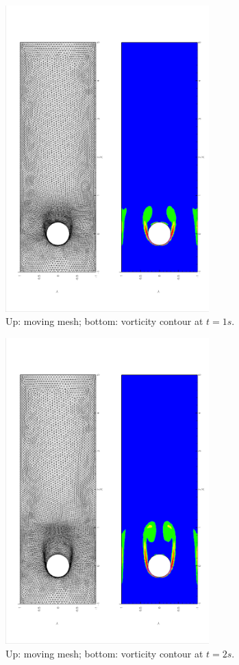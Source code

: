 \documentclass[a4paper, 11pt]{article}
\begin{document}
      \begin{figure}[!htbp]
        \centering
        \includegraphics[width = 0.7\textwidth, angle = -90]{picture/obstacle_flow_data/mesh_t_1s.eps}
        \caption{\small Up: moving mesh; bottom: vorticity
          contour at $t = 1s$.}
        \label{fig::cylinder_mesh_t1s}
      \end{figure}

     \begin{figure}[!htbp]
        \centering
        \includegraphics[width = 0.7\textwidth, angle = -90]{picture/obstacle_flow_data/mesh_t_2s.eps}
        \caption{\small Up: moving mesh; bottom: vorticity contour at $t
          = 2s$.}
        \label{fig::cylinder_mesh_t2s}
      \end{figure}
\end{document}
